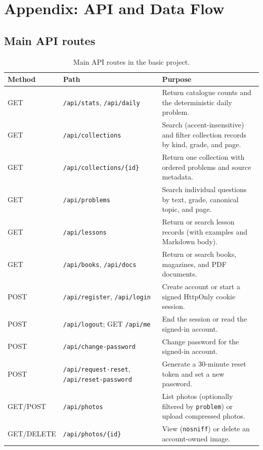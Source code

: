 \section{Appendix: API and Data Flow}
\subsection{Main API routes}
\begin{table}[ht]
\centering\small
\begin{tabularx}{\textwidth}{@{}l l X@{}}
\toprule
\textbf{Method} & \textbf{Path} & \textbf{Purpose}\\
\midrule
GET & \texttt{/api/stats}, \texttt{/api/daily} & Return catalogue counts and the deterministic daily problem.\\
GET & \texttt{/api/collections} & Search (accent-insensitive) and filter collection records by kind, grade, and page.\\
GET & \texttt{/api/collections/\{id\}} & Return one collection with ordered problems and source metadata.\\
GET & \texttt{/api/problems} & Search individual questions by text, grade, canonical topic, and page.\\
GET & \texttt{/api/lessons} & Return or search lesson records (with examples and Markdown body).\\
GET & \texttt{/api/books}, \texttt{/api/docs} & Return or search books, magazines, and PDF documents.\\
POST & \texttt{/api/register}, \texttt{/api/login} & Create account or start a signed HttpOnly cookie session.\\
POST & \texttt{/api/logout}; GET \texttt{/api/me} & End the session or read the signed-in account.\\
POST & \texttt{/api/change-password} & Change password for the signed-in account.\\
POST & \texttt{/api/request-reset}, \texttt{/api/reset-password} & Generate a 30-minute reset token and set a new password.\\
GET/POST & \texttt{/api/photos} & List photos (optionally filtered by \texttt{problem}) or upload compressed photos.\\
GET/DELETE & \texttt{/api/photos/\{id\}} & View (\texttt{nosniff}) or delete an account-owned image.\\
\bottomrule
\end{tabularx}
\caption{Main API routes in the basic project.}
\end{table}

